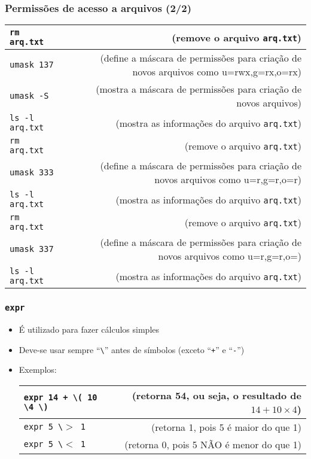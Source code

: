 \documentclass[aspectratio=169]{beamer}
\begin{document}
\begin{frame}\frametitle{Permissões de acesso a arquivos (2/2)}
\begin{tabular}{lp{1.5	cm}r}
\texttt{rm arq.txt} & & \tiny{(remove o arquivo \texttt{arq.txt})}\\\hline
\texttt{umask 137} & & \tiny{(define a máscara de permissões para criação de novos arquivos como u=rwx,g=rx,o=rx)}\\\hline
\texttt{umask -S} & & \tiny{(mostra a máscara de permissões para criação de novos arquivos)}\\\hline
\texttt{ls -l arq.txt} & & \tiny{(mostra as informações do arquivo \texttt{arq.txt})}\\\hline
\texttt{rm arq.txt} & & \tiny{(remove o arquivo \texttt{arq.txt})}\\\hline
\texttt{umask 333} & & \tiny{(define a máscara de permissões para criação de novos arquivos como u=r,g=r,o=r)}\\\hline
\texttt{ls -l arq.txt} & & \tiny{(mostra as informações do arquivo \texttt{arq.txt})}\\\hline
\texttt{rm arq.txt} & & \tiny{(remove o arquivo \texttt{arq.txt})}\\\hline
\texttt{umask 337} & & \tiny{(define a máscara de permissões para criação de novos arquivos como u=r,g=r,o=)}\\\hline
\texttt{ls -l arq.txt} & & \tiny{(mostra as informações do arquivo \texttt{arq.txt})}\\\hline
\end{tabular}
\end{frame}

\begin{frame}\frametitle{\texttt{expr}}
\begin{itemize}
	\item É utilizado para fazer cálculos simples
	\item Deve-se usar sempre ``\texttt{\textbackslash}'' antes de símbolos (exceto ``\texttt{+}'' e ``\texttt{-}'')
	\item Exemplos:\\
\begin{tabular}{lp{2.5cm}r}
\texttt{expr 14 + \textbackslash( 10 \textbackslash* 4 \textbackslash)} & & \tiny{(retorna 54, ou seja, o resultado de $14 + 10 \times 4$)}\\\hline
\texttt{expr 5 \textbackslash$>$ 1} & & \tiny{(retorna 1, pois 5 é maior do que 1)}\\\hline
\texttt{expr 5 \textbackslash$<$ 1} & & \tiny{(retorna 0, pois 5 NÃO é menor do que 1)}\\
\end{tabular}
\end{itemize}
\end{frame}
\end{document}

